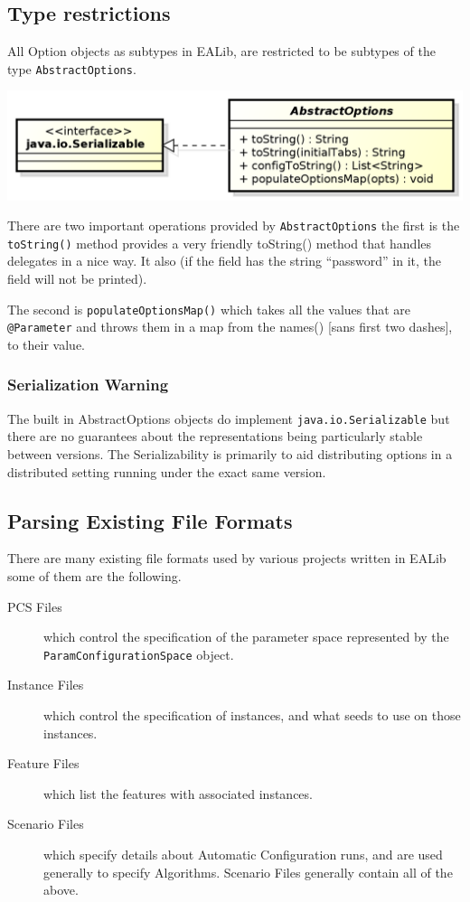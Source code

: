 \documentclass[11pt,letterpaper,oneside]{article}
\begin{document}
\subsection{Type restrictions}

All Option objects as subtypes in EALib, are restricted to be subtypes of the type \texttt{AbstractOptions}.
\begin{center}
\includegraphics[scale=0.75]{img/UML/AbstractOptions.png}
\end{center}

There are two important operations provided by \texttt{AbstractOptions} the first is the \texttt{toString()} method provides a very friendly toString() method that handles delegates in a nice way. It also (if the field has the string ``password'' in it, the field will not be printed).

The second is \texttt{populateOptionsMap()} which takes all the values that are \texttt{@Parameter} and throws them in a map from the names() [sans first two dashes], to their value.

\subsubsection*{Serialization Warning}

The built in AbstractOptions objects do implement \texttt{java.io.Serializable} but there are no guarantees about the representations being particularly stable between versions. The Serializability is primarily to aid distributing options in a distributed setting running under the exact same version. 

\subsection{Parsing Existing File Formats}

There are many existing file formats used by various projects written in EALib some of them are the following.

\begin{description}
\item[PCS Files] which control the specification of the parameter space represented by the \texttt{ParamConfigurationSpace} object.
\item[Instance Files] which control the specification of instances, and what seeds to use on those instances.
\item[Feature Files] which list the features with associated instances.
\item[Scenario Files] which specify details about Automatic Configuration runs, and are used generally to specify Algorithms. Scenario Files generally contain all of the above.
\end{description}
\end{document}
